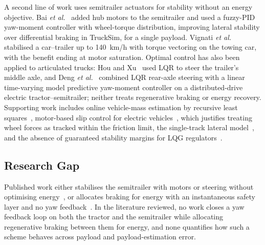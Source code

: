 \documentclass[conference]{IEEEtran}
\begin{document}
A second line of work uses semitrailer actuators for stability without an energy objective. Bai \emph{et al.}~\cite{bai2020} added hub motors to the semitrailer and used a fuzzy-PID yaw-moment controller with wheel-torque distribution, improving lateral stability over differential braking in TruckSim, for a single payload. Vignati \emph{et al.}~\cite{vignati2020} stabilised a car--trailer up to 140~km/h with torque vectoring on the towing car, with the benefit ending at motor saturation. Optimal control has also been applied to articulated trucks: Hou and Xu~\cite{hou2022} used LQR to steer the trailer's middle axle, and Deng \emph{et al.}~\cite{deng2026} combined LQR rear-axle steering with a linear time-varying model predictive yaw-moment controller on a distributed-drive electric tractor--semitrailer; neither treats regenerative braking or energy recovery. Supporting work includes online vehicle-mass estimation by recursive least squares~\cite{vahidi2005}, motor-based slip control for electric vehicles~\cite{ivanov2015}, which justifies treating wheel forces as tracked within the friction limit, the single-track lateral model~\cite{rajamani2012}, and the absence of guaranteed stability margins for LQG regulators~\cite{doyle1978}.

\subsection{Research Gap}
Published work either stabilises the semitrailer with motors or steering without optimising energy~\cite{bai2020,vignati2020,hou2022,deng2026}, or allocates braking for energy with an instantaneous safety layer and no yaw feedback~\cite{erdinc2024thesis,erdinc2024avec}. In the literature reviewed, no work closes a yaw feedback loop on both the tractor and the semitrailer while allocating regenerative braking between them for energy, and none quantifies how such a scheme behaves across payload and payload-estimation error.
\end{document}

